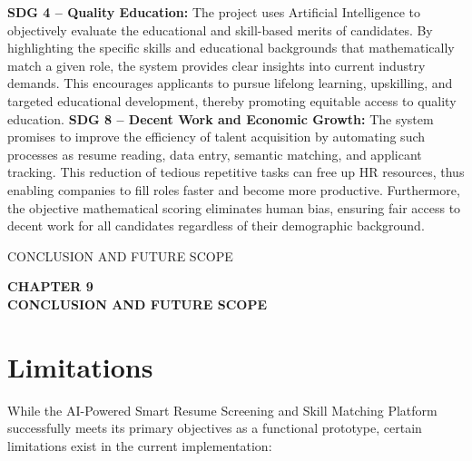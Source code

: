 \documentclass[12pt,a4paper]{report}
\begin{document}
\textbf{SDG 4 -- Quality Education:}
The project uses Artificial Intelligence to objectively evaluate the educational and skill-based merits of candidates. By highlighting the specific skills and educational backgrounds that mathematically match a given role, the system provides clear insights into current industry demands. This encourages applicants to pursue lifelong learning, upskilling, and targeted educational development, thereby promoting equitable access to quality education.
\textbf{SDG 8 -- Decent Work and Economic Growth:}
The system promises to improve the efficiency of talent acquisition by
automating such processes as resume reading, data entry, semantic matching, and applicant tracking. This
reduction of tedious repetitive tasks can free up HR resources, thus
enabling companies to fill roles faster and become more productive. Furthermore, the objective mathematical scoring eliminates human bias, ensuring fair access to decent work for all candidates regardless of their demographic background.

\clearpage


{\protect\numberline{\thechapter}CONCLUSION AND FUTURE SCOPE}

\thispagestyle{empty}

\vspace*{\fill}

\begin{center}
    {\fontsize{14pt}{17pt}\selectfont\textbf{CHAPTER 9}}\\[1cm]
    {\fontsize{14pt}{17pt}\selectfont\textbf{CONCLUSION AND FUTURE SCOPE}}
\end{center}

\vspace*{\fill}

\clearpage

\section{Limitations}

While the AI-Powered Smart Resume Screening and Skill Matching Platform successfully meets its
primary objectives as a functional prototype, certain limitations exist in
the current implementation:
\end{document}
